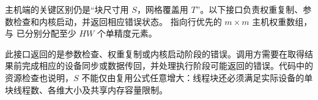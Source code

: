 主机端的关键区别仍是“块尺寸用 $S$，网格覆盖用 $T$”。以下接口负责权重复制、参数检查和内核启动，并返回相应错误状态。\mbox{} 指向行优先的 $m\times m$ 主机权重数组，\mbox{} 与 \mbox{} 已分别分配至少 $HW$ 个单精度元素。

\noindent\begin{minipage}{\textwidth}

\end{minipage}

此接口返回的是参数检查、权重复制或内核启动阶段的错误。调用方需要在取得结果前完成相应的设备同步或数据传回，并处理执行阶段可能返回的错误。代码中的资源检查也说明，$S$ 不能仅由复用公式任意增大：线程块还必须满足实际设备的单块线程数、各维大小及共享内存容量限制。

\FloatBarrier
